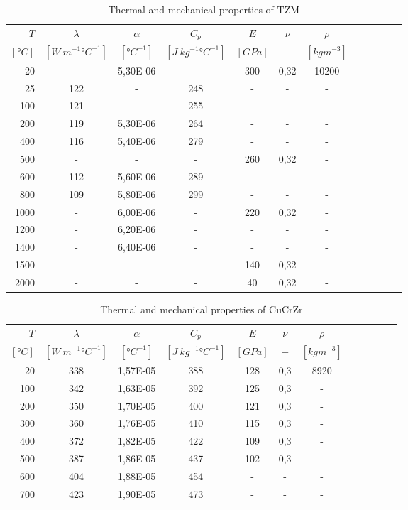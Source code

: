 \begin{table}\centering
    \begin{tabular}{@{}rccccccccccc@{}}\toprule
    $T$ & $\lambda$ & $\alpha$ & $C_p$ & $E$ & $\nu$ & $\rho$\\
    \cmidrule{1-7}
    $[\si{\degree} C]$ & $[W \ m^{-1} \si{\degree} C^{-1}]$ & $[\si{\degree} C^{-1}]$ & $[J \ kg^{-1} \si{\degree} C^{-1}]$ & $[GPa]$ & $-$ & $[kg m^{-3}]$\\
    \midrule
    20&-&5,30E-06&-&300&0,32&10200\\
    25&122&-&248&-&-&-\\
    100&121&-&255&-&-&-\\
    200&119&5,30E-06&264&-&-&-\\
    400&116&5,40E-06&279&-&-&-\\
    500&-&-&-&260 &0,32&-\\
    600&112&5,60E-06&289&-&-&-\\
    800&109&5,80E-06&299&-&-&-\\
    1000&-& 6,00E-06&-& 220 &0,32&-\\
    1200&-& 6,20E-06&-&-&-&-\\
    1400&-& 6,40E-06&-&-&-&-\\
    1500&-&-&-&140&0,32&-\\
    2000&-&-&-&40&0,32&-\\
\bottomrule
\end{tabular}
\caption{Thermal and mechanical properties of \acrlong{TZM}}
\end{table}

\begin{table}\centering
    \begin{tabular}{@{}rccccccccccc@{}}\toprule
    $T$ & $\lambda$ & $\alpha$ & $C_p$ & $E$ & $\nu$ & $\rho$\\
    \cmidrule{1-7}
    $[\si{\degree} C]$ & $[W \ m^{-1} \si{\degree} C^{-1}]$ & $[\si{\degree} C^{-1}]$ & $[J \ kg^{-1} \si{\degree} C^{-1}]$ & $[GPa]$ & $-$ & $[kg m^{-3}]$\\
    \midrule
    20 & 338 & 1,57E-05 & 388 & 128 & 0,3 & 8920 \\
    100 & 342 & 1,63E-05 & 392 & 125 & 0,3 & - \\
    200 & 350 & 1,70E-05 & 400 & 121 & 0,3 & - \\
    300 & 360 & 1,76E-05 & 410 & 115 & 0,3 & - \\
    400 & 372 & 1,82E-05 & 422 & 109 & 0,3 & - \\
    500 & 387 & 1,86E-05 & 437 & 102 & 0,3 & - \\
    600 & 404 & 1,88E-05 & 454 & - & - & - \\
    700 & 423 & 1,90E-05 & 473 & - & - & - \\
\bottomrule
\end{tabular}
\caption{Thermal and mechanical properties of \acrlong{CuCrZr}}
\end{table}

